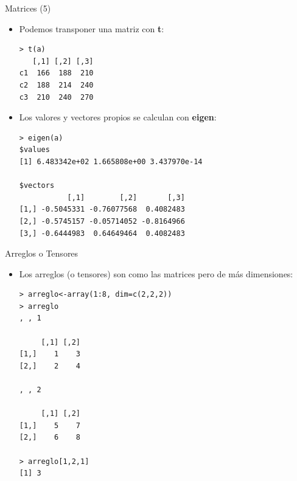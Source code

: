 \documentclass[handout]{beamer}
\begin{document}
\begin{frame}[fragile]{Matrices (5)}
\scriptsize{
\begin{itemize}
\item Podemos transponer una matriz con \textbf{t}:
 \begin{verbatim}
> t(a)
   [,1] [,2] [,3]
c1  166  188  210
c2  188  214  240
c3  210  240  270
\end{verbatim}
\item Los valores y vectores propios se calculan con \textbf{eigen}:
\begin{verbatim}
> eigen(a)
$values
[1] 6.483342e+02 1.665808e+00 3.437970e-14

$vectors
           [,1]        [,2]       [,3]
[1,] -0.5045331 -0.76077568  0.4082483
[2,] -0.5745157 -0.05714052 -0.8164966
[3,] -0.6444983  0.64649464  0.4082483
 \end{verbatim}

\end{itemize}


 
}

\end{frame}

\begin{frame}[fragile]{Arreglos o Tensores}
\scriptsize{
\begin{itemize}
 \item Los arreglos (o tensores) son como las matrices pero de más dimensiones:
 \begin{verbatim}
> arreglo<-array(1:8, dim=c(2,2,2))
> arreglo
, , 1

     [,1] [,2]
[1,]    1    3
[2,]    2    4

, , 2

     [,1] [,2]
[1,]    5    7
[2,]    6    8

> arreglo[1,2,1]
[1] 3
 \end{verbatim}

\end{itemize}


}
\end{frame}
\end{document}
